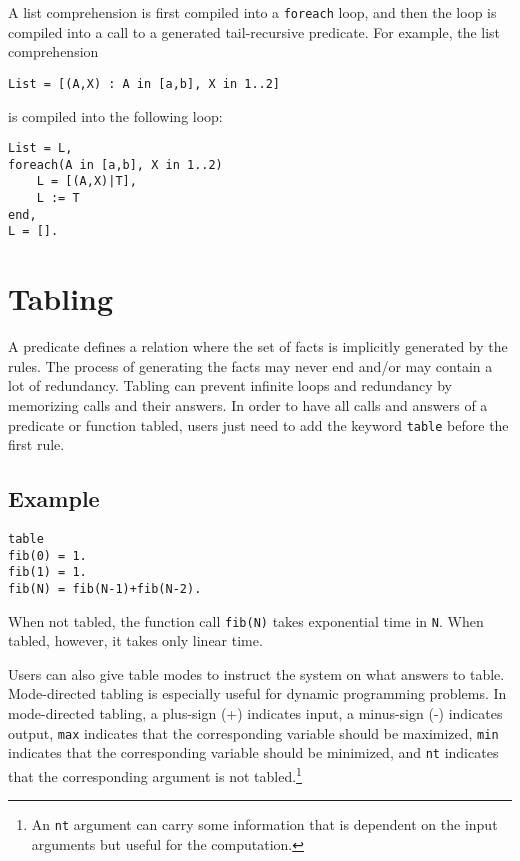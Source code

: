 A list comprehension is first compiled into a \texttt{foreach} loop, and then the loop is compiled into a call to a generated tail-recursive predicate. For example, the list comprehension 
\begin{verbatim}
List = [(A,X) : A in [a,b], X in 1..2]
\end{verbatim}
is compiled into the following loop:
\begin{verbatim}
List = L,
foreach(A in [a,b], X in 1..2)
    L = [(A,X)|T],
    L := T
end,
L = [].
\end{verbatim}

\section{Tabling}
A predicate defines a relation where the set of facts is implicitly generated by the rules. The process of generating the facts may never end and/or may contain a lot of redundancy. Tabling can prevent infinite loops and redundancy by memorizing calls and their answers. In order to have all calls and answers of a predicate or function tabled, users just need to add the keyword \texttt{table} before the first rule.

\subsection*{Example}
\begin{verbatim}
table
fib(0) = 1.
fib(1) = 1.
fib(N) = fib(N-1)+fib(N-2).
\end{verbatim}
When not tabled, the function call \texttt{fib(N)} takes exponential time in \texttt{N}. When tabled, however, it takes only linear time.

Users can also give table modes to instruct the system on what answers to table. Mode-directed tabling is especially useful for dynamic programming problems. In mode-directed tabling, a plus-sign (+) indicates input, a minus-sign (-) indicates output, \texttt{max} indicates that the corresponding variable should be maximized, \texttt{min} indicates that the corresponding variable should be minimized, and \texttt{nt} indicates that the corresponding argument is not tabled.\footnote{An {\tt nt} argument can carry some information that is dependent on the input arguments but useful for the computation.}


